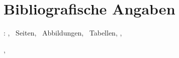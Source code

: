 
\chapter*{Bibliografische Angaben}
\label{sec:Referat}

\autor : \titel , \pageref*{LastPage}~Seiten, \totalfigures ~Abbildungen, \totaltables ~Tabellen, \hochschule , \fachbereich

\arbeit , \the\year

\Satz